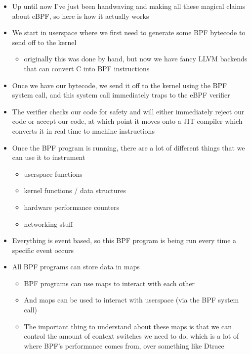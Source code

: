 \documentclass[
  12pt]{findlay}
\providecommand{\tightlist}{\setlength{\itemsep}{0pt}\setlength{\parskip}{0pt}}
\begin{document}
\begin{itemize}
\tightlist
\item
  Up until now I've just been handwaving and making all these magical
  claims about eBPF, so here is how it actually works
\item
  We start in userspace where we first need to generate some BPF
  bytecode to send off to the kernel

  \begin{itemize}
  \tightlist
  \item
    originally this was done by hand, but now we have fancy LLVM
    backends that can convert C into BPF instructions
  \end{itemize}
\item
  Once we have our bytecode, we send it off to the kernel using the BPF
  system call, and this system call immediately traps to the eBPF
  verifier
\item
  The verifier checks our code for safety and will either immediately
  reject our code or accept our code, at which point it moves onto a JIT
  compiler which converts it in real time to machine instructions
\item
  Once the BPF program is running, there are a lot of different things
  that we can use it to instrument

  \begin{itemize}
  \tightlist
  \item
    userspace functions
  \item
    kernel functions / data structures
  \item
    hardware performance counters
  \item
    networking stuff
  \end{itemize}
\item
  Everything is event based, so this BPF program is being run every time
  a specific event occurs
\item
  All BPF programs can store data in maps

  \begin{itemize}
  \tightlist
  \item
    BPF programs can use maps to interact with each other
  \item
    And maps can be used to interact with userspace (via the BPF system
    call)
  \item
    The important thing to understand about these maps is that we can
    control the amount of context switches we need to do, which is a lot
    of where BPF's performance comes from, over something like Dtrace
  \end{itemize}
\end{itemize}
\end{document}
